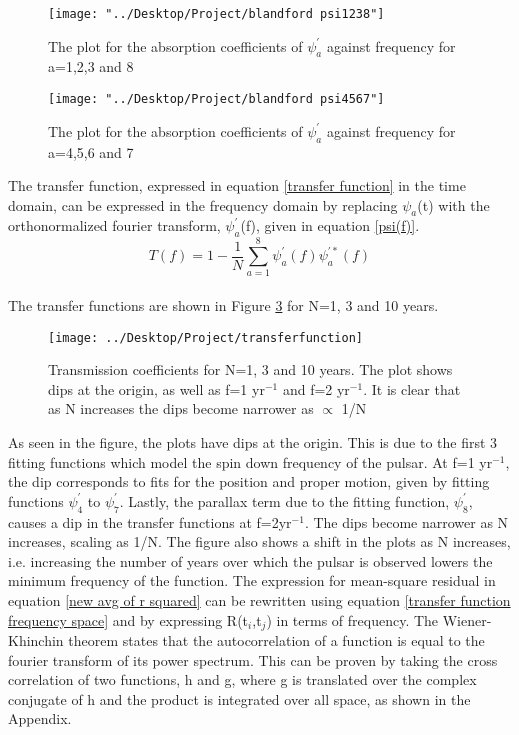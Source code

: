\documentclass[12pt]{article}
\begin{document}
\begin{figure}[th!]
	\texttt{[image: "../Desktop/Project/blandford psi1238"]}
	\caption{\label{fig:blandford_psi1238.png} The plot for the absorption coefficients of $\psi_a^{'}$ against frequency for a=1,2,3 and 8}
	\label{fig:blandford-psi1238}
\end{figure}
\begin{figure}[th!]
	\texttt{[image: "../Desktop/Project/blandford psi4567"]}
	\caption{\label{fig:blandford_psi4567.png} The plot for the absorption coefficients of $\psi_a^{'}$ against frequency for a=4,5,6 and 7}
	\label{fig:blandford-psi4567}
\end{figure}
	The transfer function, expressed in equation \ref{transfer function} in the time domain, can be expressed in the frequency domain by replacing $\psi_a$(t) with the orthonormalized fourier transform, $\psi_a^{'}$(f), given in equation \ref{psi(f)}.\\
	\begin{equation}\label{transfer function frequency space}
	T(f)=1-\frac{1}{N}\sum_{a=1}^{8}\psi_a^{'}(f)\psi_a^{'*}(f)
	\end{equation}\\
	The transfer functions are shown in Figure \ref{fig:transferfunction} for N=1, 3 and 10 years. 
\begin{figure}[th!]
	\texttt{[image: ../Desktop/Project/transferfunction]}
	\caption{\label{fig:transferfunction}Transmission coefficients for N=1, 3 and 10 years. The plot shows dips at the origin, as well as f=1 yr$^{-1}$ and f=2 yr$^{-1}$. It is clear that as N increases the dips become narrower as $\propto$ 1/N}
\end{figure}
	As seen in the figure, the plots have dips at the origin. This is due to the first 3 fitting functions which model the spin down frequency of the pulsar. At f=1 yr$^{-1}$, the dip corresponds to fits for the position and proper motion, given by fitting functions $\psi_4^{'}$ to $\psi_7^{'}$. Lastly, the parallax term due to the fitting function, $\psi_8^{'}$, causes a dip in the transfer functions at f=2yr$^{-1}$. The dips become narrower as N increases, scaling as 1/N. The figure also shows a shift in the plots as N increases, i.e. increasing the number of years over which the pulsar is observed lowers the minimum frequency of the function.
	The expression for mean-square residual in equation \ref{new avg of r squared} can be rewritten using equation \ref{transfer function frequency space} and by expressing R(t$_i$,t$_j$) in terms of frequency. The Wiener-Khinchin theorem states that the autocorrelation of a function is equal to the fourier transform of its power spectrum. This can be proven by taking the cross correlation of two functions, h and g, where g is translated over the complex conjugate of h and the product is integrated over all space, as shown in the Appendix.\\ 
\end{document}
